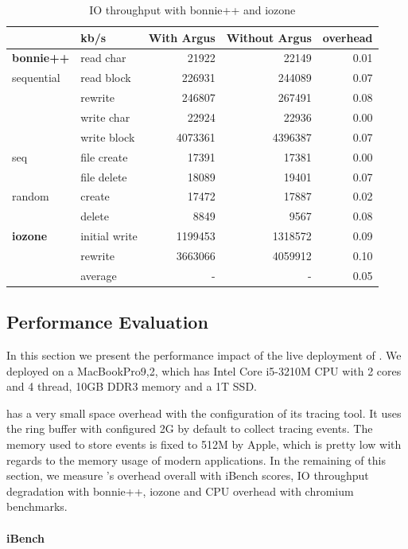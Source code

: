 \begin{table}[tb]
\footnotesize
\centering
\begin{tabular}{ll|rrr}
\hline
\hline
 & kb/s & With Argus & Without Argus & overhead\\
 \hline
\textbf{bonnie++}&read char & 21922 & 22149 & 0.01\\
 sequential& read block & 226931 & 244089 & 0.07\\
 & rewrite & 246807 & 267491 & 0.08\\
 & write char & 22924 & 22936 & 0.00\\
 & write block & 4073361 & 4396387 & 0.07\\
 \hline
 seq& file create & 17391 & 17381 & 0.00\\
 & file delete & 18089 & 19401 & 0.07\\
 \hline
 random& create & 17472 & 17887 & 0.02\\
 & delete & 8849 & 9567 & 0.08\\
 \hline
 \hline
\textbf{iozone} & initial write & 1199453 & 1318572 & 0.09\\
 & rewrite & 3663066 & 4059912 & 0.10\\
 \hline
 & average & - & - & 0.05\\
\hline
\hline
\end{tabular}
\caption{IO throughput with bonnie++ and iozone}
\label{tab:iothroughput}
\end{table}


\subsection{Performance Evaluation}\label{sec:evaluation}

In this section we present the performance impact of the live deployment of
\xxx. We deployed \xxx on a MacBookPro9,2, which has Intel Core i5-3210M CPU with
2 cores and 4 thread, 10GB DDR3 memory and a 1T SSD.

\xxx has a very small space overhead with the configuration of its tracing
tool. It uses the ring buffer with configured 2G by default to collect tracing
events. The memory used to store events is fixed to 512M by Apple, which is pretty
low with regards to the memory usage of modern applications. In the remaining
of this section, we measure \xxx's overhead overall with iBench scores, IO
throughput degradation with bonnie++, iozone and CPU overhead with chromium
benchmarks.

\paragraph{iBench}

